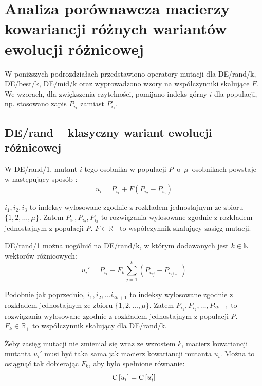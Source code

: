 \documentclass[a4paper,onecolumn,oneside,12pt,wide,floatssmall]{mwrep}
\def\C{{\rm C}\,}
\theoremstyle{definition}
\theoremstyle{plain}%
\theoremstyle{remark}
\begin{document}
\section{Analiza porównawcza macierzy kowariancji różnych wariantów ewolucji różnicowej}

W poniższych podrozdziałach przedstawiono operatory mutacji dla DE/rand/k, DE/best/k, DE/mid/k 
oraz wyprowadzono wzory na współczynniki skalujące $F$. We wzorach, dla zwiększenia
czytelności, pomijano indeks górny $i$ dla populacji, np. stosowano zapis $P_{i_1}$ 
zamiast $P_{i_1}^i$.

\subsection{DE/rand -- klasyczny wariant ewolucji różnicowej}
\label{chap:de_rand} 

W DE/rand/1, mutant $i$-tego osobnika w populacji $P$~o~$\mu$~osobnikach powstaje w następujący sposób 
\cite{decomposition}:
\begin{equation} \label{eq:derand1}
u_i = P_{i_1} + F(P_{i_2} - P_{i_3})
\end{equation}

$i_1, i_2, i_3$ to indeksy wylosowane zgodnie z rozkładem jednostajnym ze zbioru \\ 
$\{1, 2, \dots, \mu\}$. Zatem $P_{i_1}, P_{i_2}, P_{i_3}$ to rozwiązania wylosowane zgodnie z 
rozkładem jednostajnym z populacji $P$.
$F\in\mathbb{R_+}$ to współczynnik skalujący zasięg mutacji. 

DE/rand/1 można uogólnić na DE/rand/k, w którym dodawanych jest
$k \in \mathbb{N}$ wektorów różnicowych:
\begin{equation} \label{eq:derand}
u_i' = P_{i_1} + F_k\sum\limits_{j=1}^k (P_{i_{2j}} - P_{i_{2j+1}})
\end{equation}

Podobnie jak poprzednio, $i_1, i_2, \dots i_{2k+1}$ to indeksy wylosowane zgodnie z rozkładem jednostajnym ze zbioru 
$\{1, 2, \dots, \mu\}$. Zatem $P_{i_1}, P_{i_2}, \dots, P_{2k+1}$ to rozwiązania wylosowane zgodnie z rozkładem 
jednostajnym z populacji $P$. $F_k\in\mathbb{R_+}$ to współczynnik skalujący dla DE/rand/k. 

Żeby zasięg mutacji nie zmieniał się wraz ze wzrostem $k$, 
macierz kowariancji mutanta $u_i'$ musi być taka sama jak macierz kowariancji mutanta $u_i$.
Można to osiągnąć tak dobierając $F_k$, aby było spełnione równanie:
\begin{equation} \label{eq:kowariancje}
\C[u_i] = \C[u_i']
\end{equation}
\end{document}
